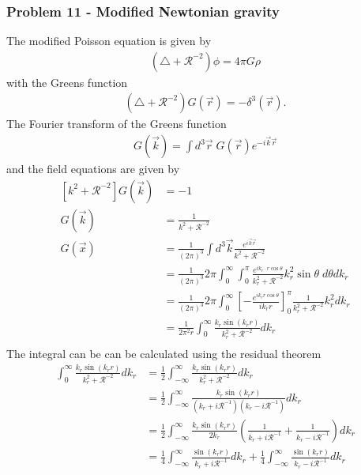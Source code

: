 \documentclass[10pt,a4paper]{book}
\theoremstyle{definition}
\begin{document}
\subsubsection{Problem 11 - Modified Newtonian gravity}
The modified Poisson equation is given by
\begin{align}
    \left(\triangle+\mathcal{R}^{-2}\right)\phi=4\pi G\rho
\end{align}
with the Greens function
\begin{align}
    \left(\triangle+\mathcal{R}^{-2}\right)G(\vec{r})=-\delta^3(\vec{r}).
\end{align}
The Fourier transform of the Greens function
\begin{align}
    G(\vec{k}) = \int d^3\vec{r}\;G(\vec{r})e^{-i\vec{k}\vec{r}}
\end{align}
and the field equations are given by
\begin{align}
    \left[k^2+\mathcal{R}^{-2}\right]G(\vec{k})&=-1\\
    G(\vec{k})&=\frac{1}{k^2+\mathcal{R}^{-2}}\\
    G(\vec{x})&=\frac{1}{(2\pi)^3}\int d^3\vec{k} \frac{e^{i\vec{k}\vec{r}}}{k^2+\mathcal{R}^{-2}}\\
    &=\frac{1}{(2\pi)^3}2\pi\int_0^\infty \int_{0}^{\pi} \frac{e^{ik_r\cdot r\cos\theta}}{k_r^2+\mathcal{R}^{-2}}k_r^2\sin\theta\;d\theta dk_r\\
    &=\frac{1}{(2\pi)^3}2\pi\int_0^\infty \left[-\frac{e^{ik_r r \cos\theta}}{ik_r r}\right]_0^\pi \frac{1}{k_r^2+\mathcal{R}^{-2}}k_r^2 dk_r\\
    &=\frac{1}{2\pi^2r}\int_0^\infty  \frac{k_r \sin(k_r r)}{k_r^2+\mathcal{R}^{-2}} dk_r\\
\end{align}
The integral can be can be calculated using the residual theorem
\begin{align}
        \int_0^\infty \frac{k_r \sin(k_r r)}{k_r^2+\mathcal{R}^{-2}} dk_r&=\frac{1}{2}\int_{-\infty}^\infty \frac{k_r \sin(k_r r)}{k_r^2+\mathcal{R}^{-2}} dk_r\\
        &=\frac{1}{2}\int_{-\infty}^\infty \frac{k_r \sin(k_r r)}{(k_r+i\mathcal{R}^{-1})(k_r-i\mathcal{R}^{-1})} dk_r\\
        &=\frac{1}{2}\int_{-\infty}^\infty \frac{k_r \sin(k_r r)}{2k_r}\left(\frac{1}{k_r+i\mathcal{R}^{-1}}+\frac{1}{k_r-i\mathcal{R}^{-1}}\right) dk_r\\
        &=\frac{1}{4}\int_{-\infty}^\infty \frac{\sin(k_r r)}{k_r+i\mathcal{R}^{-1}}dk_r + \frac{1}{4}\int_{-\infty}^\infty \frac{\sin(k_r r)}{k_r-i\mathcal{R}^{-1}}dk_r
\end{align}
\end{document}
